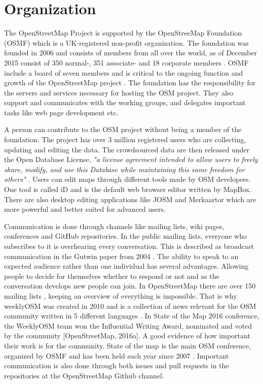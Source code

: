 \section{Organization}
The OpenStreetMap Project is supported by the OpenStreeMap Foundation (OSMF) which is a UK-registered non-profit organization. The foundation was founded in 2006 and consists of members from all over the world, as of December 2015 consist of 350 normal-, 351 associate- and 18 corporate members \cite{OSMF2015}. OSMF include a board of seven members and is critical to the ongoing function and growth of the OpenStreetMap project \cite{OSMF}.  The foundation has the responsibility for the servers and services necessary for hosting the OSM project. They also support and communicates with the working groups, and delegates important tasks like web page development etc. 

A person can contribute to the OSM project without being a member of the foundation. The project has over 3 million registered users \cite{OSMProject2016} who are collecting, updating and editing the data. The crowdsourced data are then released under the Open Database License, \textit{"a license agreement intended to allow users to freely share, modify, and use this Database while maintaining this same freedom for others"} \cite{ODbL}.  Users can edit maps through different tools made by OSM developers. One tool is called iD and is the default web browser editor written by MapBox. There are also desktop editing applications like JOSM and Merkaartor which are more powerful and better suited for advanced users. 

Communication is done through channels like mailing lists, wiki pages, conferences and GitHub repositories. In the public mailing lists, everyone who subscribes to it is overhearing every conversation. This is described as broadcast communication in the Gutwin paper from 2004 \cite{Gutwin2004}. The ability to speak to an expected audience rather than one individual has several advantages. Allowing people to decide for themselves whether to respond or not and as the conversation develops new people can join. In OpenStreetMap there are over 150 mailing lists \cite{Reiter2016}, keeping an overview of everything is impossible. That is why weeklyOSM was created in 2010 and is a collection of news relevant for the OSM community written in 5 different languages \cite{Freyfogle2016}.  In State of the Map 2016 conference, the WeeklyOSM team won the Influential Writing Award, nominated and voted by the community [OpenStreetMap, 2016a]. A good evidence of how important their work is for the community. State of the map is the main OSM conference, organized by OSMF and has been held each year since 2007 \cite{OpenStreetMapj}. Important communication is also done through both issues and pull requests in the repositories at the OpenStreetMap Github channel. 

